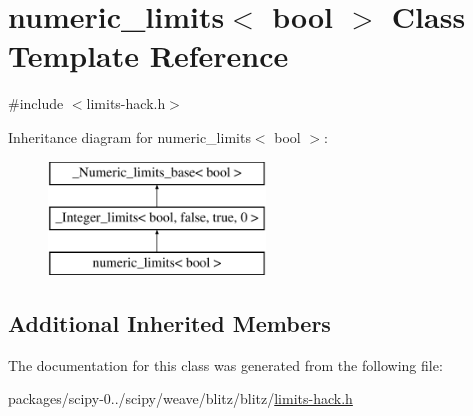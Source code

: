 \hypertarget{classnumeric__limits_3_01bool_01_4}{}\section{numeric\+\_\+limits$<$ bool $>$ Class Template Reference}
\label{classnumeric__limits_3_01bool_01_4}


{\ttfamily \#include $<$limits-\/hack.\+h$>$}

Inheritance diagram for numeric\+\_\+limits$<$ bool $>$\+:\begin{figure}[H]
\begin{center}
\leavevmode
\includegraphics[height=3.000000cm]{classnumeric__limits_3_01bool_01_4}
\end{center}
\end{figure}
\subsection*{Additional Inherited Members}


The documentation for this class was generated from the following file\+:\begin{DoxyCompactItemize}
\item 
packages/scipy-\/0../scipy/weave/blitz/blitz/\hyperlink{limits-hack_8h}{limits-\/hack.\+h}\end{DoxyCompactItemize}
